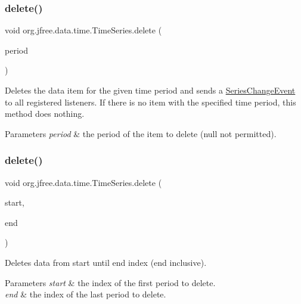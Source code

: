 \subsubsection{\texorpdfstring{delete()}{delete()}\hspace{0.1cm}{\footnotesize\ttfamily [1/3]}}
{\footnotesize\ttfamily void org.\+jfree.\+data.\+time.\+Time\+Series.\+delete (\begin{DoxyParamCaption}\item[{\mbox{\hyperlink{classorg_1_1jfree_1_1data_1_1time_1_1_regular_time_period}{Regular\+Time\+Period}}}]{period }\end{DoxyParamCaption})}

Deletes the data item for the given time period and sends a \mbox{\hyperlink{}{Series\+Change\+Event}} to all registered listeners. If there is no item with the specified time period, this method does nothing.


\begin{DoxyParams}{Parameters}
{\em period} & the period of the item to delete ({\ttfamily null} not permitted). \\
\hline
\end{DoxyParams}
\mbox{\label{classorg_1_1jfree_1_1data_1_1time_1_1_time_series_a5133f26d7b87d176e5b07b1cbf189b95}} 
\subsubsection{\texorpdfstring{delete()}{delete()}\hspace{0.1cm}{\footnotesize\ttfamily [2/3]}}
{\footnotesize\ttfamily void org.\+jfree.\+data.\+time.\+Time\+Series.\+delete (\begin{DoxyParamCaption}\item[{int}]{start,  }\item[{int}]{end }\end{DoxyParamCaption})}

Deletes data from start until end index (end inclusive).


\begin{DoxyParams}{Parameters}
{\em start} & the index of the first period to delete. \\
\hline
{\em end} & the index of the last period to delete. \\
\hline
\end{DoxyParams}
\mbox{\label{classorg_1_1jfree_1_1data_1_1time_1_1_time_series_a031515137054f19838f3fdf58c4e08dc}} 
